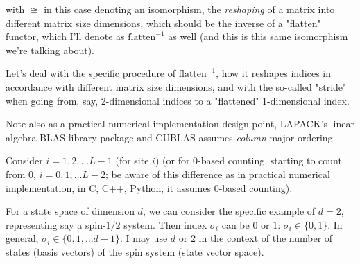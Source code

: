 \documentclass[10pt]{amsart}
\begin{document}
\begin{multicols*}{2}
with $\cong$ in this case denoting an isomorphism, the \emph{reshaping} of a matrix into different matrix size dimensions, which should be the inverse of a "flatten" functor, which I'll denote as $\text{flatten}^{-1}$ as well (and this is this same isomorphism we're talking about).  

Let's deal with the specific procedure of $\text{flatten}^{-1}$, how it reshapes indices in accordance with different matrix size dimensions, and with the so-called "stride" when going from, say, 2-dimensional indices to a "flattened" 1-dimensional index.  

Note also as a practical numerical implementation design point, LAPACK's linear algebra BLAS library package and CUBLAS assumes \emph{column}-major ordering.  

Consider $i= 1,2,\dots L-1$ (for site $i$) (or for $0$-based counting, starting to count from $0$, $i=0,1,\dots L-2$; be aware of this difference as in practical numerical implementation, in C, C++, Python, it assumes $0$-based counting).  

For a state space of dimension $d$, we can consider the specific example of $d=2$, representing say a spin-$1/2$ system.  Then index $\sigma_i$ can be $0$ or $1$: $\sigma_i \in \lbrace 0 ,1\rbrace$.  In general, $\sigma_i \in \lbrace 0 ,1, \dots d-1\rbrace$.  I may use $d$ or $2$ in the context of the number of states (basis vectors) of the spin system (state vector space).  


\end{multicols*}
\end{document}
